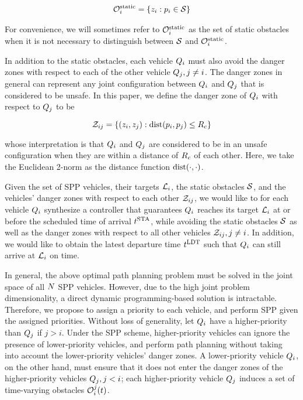 \begin{equation}
\begin{aligned}
\mathcal{O}^\text{static}_i = \{z_i: p_i \in \mathcal{S}\}
\end{aligned}
\end{equation}

For convenience, we will sometimes refer to $\mathcal{O}^\text{static}_i$ as the set of static obstacles when it is not necessary to distinguish between $\mathcal{S}$ and $\mathcal{O}^\text{static}_i$.

In addition to the static obstacles, each vehicle $Q_i$ must also avoid the danger zones with respect to each of the other vehicle $Q_j, j\neq i$. The danger zones in general can represent any joint configuration between $Q_i$ and $Q_j$ that is considered to be unsafe. In this paper, we define the danger zone of $Q_i$ with respect to $Q_j$ to be

\begin{equation}
\mathcal{Z}_{ij} = \{(z_i, z_j): \text{dist}(p_i, p_j) \le R_c\}
\end{equation}

\noindent whose interpretation is that $Q_i$ and $Q_j$ are considered to be in an unsafe configuration when they are within a distance of $R_c$ of each other. Here, we take the Euclidean 2-norm as the distance function $\text{dist}(\cdot, \cdot)$.

Given the set of SPP vehicles, their targets $\mathcal{L}_i$, the static obstacles $\mathcal{S}$, and the vehicles' danger zones with respect to each other $\mathcal{Z}_{ij}$, we would like to for each vehicle $Q_i$ synthesize a controller that guarantees $Q_i$ reaches its target $\mathcal{L}_i$ at or before the scheduled time of arrival $t^\text{STA}$, while avoiding the static obstacles $\mathcal{S}$ as well as the danger zones with respect to all other vehicles $\mathcal{Z}_{ij}, j\neq i$. In addition, we would like to obtain the latest departure time $t^\text{LDT}$ such that $Q_i$ can still arrive at $\mathcal{L}_i$ on time.

In general, the above optimal path planning problem must be solved in the joint space of all $N$ SPP vehicles. However, due to the high joint problem dimensionality, a direct dynamic programming-based solution is intractable. Therefore, we propose to assign a priority to each vehicle, and perform SPP given the assigned priorities. Without loss of generality, let $Q_i$ have a higher-priority than $Q_j$ if $j>i$. Under the SPP scheme, higher-priority vehicles can ignore the presence of lower-priority vehicles, and perform path planning without taking into account the lower-priority vehicles' danger zones. A lower-priority vehicle $Q_i$, on the other hand, must ensure that it does not enter the danger zones of the higher-priority vehicles $Q_j, j<i$; each higher-priority vehicle $Q_j$ induces a set of time-varying obstacles $\mathcal{O}_i^j(t)$.

